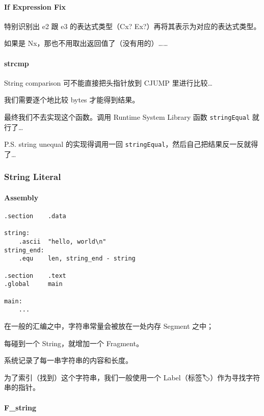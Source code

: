 \documentclass[
]{article}
\begin{document}
\hypertarget{header-n17}{%
\paragraph{If Expression Fix}\label{header-n17}}

特别识别出 e2 跟 e3 的表达式类型（Cx?
Ex?）再将其表示为对应的表达式类型。

如果是 Nx，那也不用取出返回值了（没有用的）\ldots\ldots{}

\hypertarget{header-n20}{%
\paragraph{strcmp}\label{header-n20}}

String comparison 可不能直接把头指针放到 CJUMP 里进行比较\ldots{}

我们需要逐个地比较 bytes 才能得到结果。

最终我们不去实现这个函数。调用 Runtime System Library 函数
\texttt{stringEqual} 就行了\ldots{}

P.S. string unequal 的实现得调用一回
\texttt{stringEqual}，然后自己把结果反一反就得了\ldots{}

\hypertarget{header-n25}{%
\subsubsection{String Literal}\label{header-n25}}

\hypertarget{header-n26}{%
\paragraph{Assembly}\label{header-n26}}

\begin{verbatim}
.section	.data

string:
	.ascii	"hello, world\n"
string_end:
	.equ	len, string_end - string
	
.section	.text
.global		main

main:
	...
\end{verbatim}

在一般的汇编之中，字符串常量会被放在一处内存 Segment 之中；

每碰到一个 String，就增加一个 Fragment。

系统记录了每一串字符串的内容和长度。

为了索引（找到）这个字符串，我们一般使用一个
Label（标签🏷️）作为寻找字符串的指针。

\hypertarget{header-n32}{%
\paragraph{F\_string}\label{header-n32}}
\end{document}
